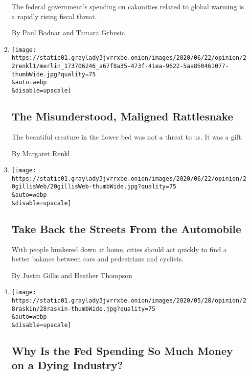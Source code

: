 \begin{enumerate}
  The federal government's spending on calamities related to global
  warming is a rapidly rising fiscal threat.

  By Paul Bodnar and Tamara Grbusic
\item
  \href{/2020/06/22/opinion/rattlesnakes.html}{}

  \texttt{[image: https://static01.graylady3jvrrxbe.onion/images/2020/06/22/opinion/22renkl1/merlin\_173706246\_a67f8a35-473f-41ea-9622-5aa850461077-thumbWide.jpg?quality=75\\\&auto=webp\\\&disable=upscale]}

  \hypertarget{the-misunderstood-maligned-rattlesnake}{%
  \subsection{The Misunderstood, Maligned
  Rattlesnake}\label{the-misunderstood-maligned-rattlesnake}}

  The beautiful creature in the flower bed was not a threat to us. It
  was a gift.

  By Margaret Renkl
\item
  \href{/2020/06/20/opinion/pandemic-automobile-cities.html}{}

  \texttt{[image: https://static01.graylady3jvrrxbe.onion/images/2020/06/22/opinion/20gillisWeb/20gillisWeb-thumbWide.jpg?quality=75\\\&auto=webp\\\&disable=upscale]}

  \hypertarget{take-back-the-streets-from-the-automobile}{%
  \subsection{Take Back the Streets From the
  Automobile}\label{take-back-the-streets-from-the-automobile}}

  With people hunkered down at home, cities should act quickly to find a
  better balance between cars and pedestrians and cyclists.

  By Justin Gillis and Heather Thompson
\item
  \href{/2020/05/28/opinion/fed-fossil-fuels.html}{}

  \texttt{[image: https://static01.graylady3jvrrxbe.onion/images/2020/05/28/opinion/28raskin/28raskin-thumbWide.jpg?quality=75\\\&auto=webp\\\&disable=upscale]}

  \hypertarget{why-is-the-fed-spending-so-much-money-on-a-dying-industry}{%
  \subsection{Why Is the Fed Spending So Much Money on a Dying
  Industry?}\label{why-is-the-fed-spending-so-much-money-on-a-dying-industry}}


\end{enumerate}
